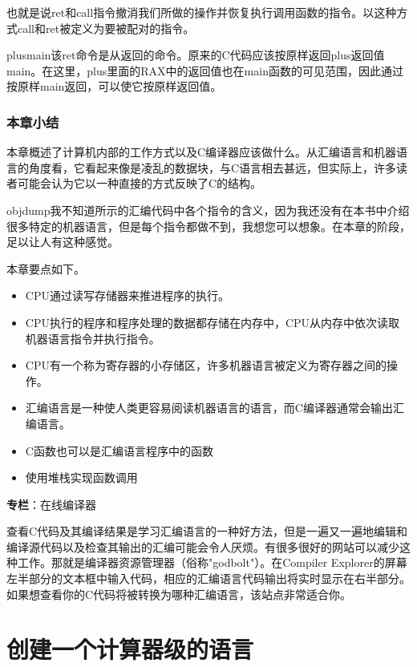 \documentclass[cn,10pt,math=newtx,citestyle=gb7714-2015,bibstyle=gb7714-2015]{elegantbook}
\begin{document}
也就是说ret和call指令撤消我们所做的操作并恢复执行调用函数的指令。以这种方式call和ret被定义为要被配对的指令。

plusmain该ret命令是从返回的命令。原来的C代码应该按原样返回plus返回值main。在这里，plus里面的RAX中的返回值也在main函数的可见范围，因此通过按原样main返回，可以使它按原样返回值。

\subsection{本章小结}

本章概述了计算机内部的工作方式以及C编译器应该做什么。从汇编语言和机器语言的角度看，它看起来像是凌乱的数据块，与C语言相去甚远，但实际上，许多读者可能会认为它以一种直接的方式反映了C的结构。

objdump我不知道所示的汇编代码中各个指令的含义，因为我还没有在本书中介绍很多特定的机器语言，但是每个指令都做不到，我想您可以想象。在本章的阶段，足以让人有这种感觉。

本章要点如下。

\begin{itemize}
  \item CPU通过读写存储器来推进程序的执行。
  \item CPU执行的程序和程序处理的数据都存储在内存中，CPU从内存中依次读取机器语言指令并执行指令。
  \item CPU有一个称为寄存器的小存储区，许多机器语言被定义为寄存器之间的操作。
  \item 汇编语言是一种使人类更容易阅读机器语言的语言，而C编译器通常会输出汇编语言。
  \item C函数也可以是汇编语言程序中的函数
  \item 使用堆栈实现函数调用
\end{itemize}

\begin{tcolorbox}
    \begin{tcolorbox}
        \textbf{专栏}：在线编译器

        查看C代码及其编译结果是学习汇编语言的一种好方法，但是一遍又一遍地编辑和编译源代码以及检查其输出的汇编可能会令人厌烦。有很多很好的网站可以减少这种工作。那就是编译器资源管理器（俗称"godbolt"）。在Compiler Explorer的屏幕左半部分的文本框中输入代码，相应的汇编语言代码输出将实时显示在右半部分。如果想查看你的C代码将被转换为哪种汇编语言，该站点非常适合你。
    \end{tcolorbox}
\end{tcolorbox}

\chapter{创建一个计算器级的语言}
\end{document}
